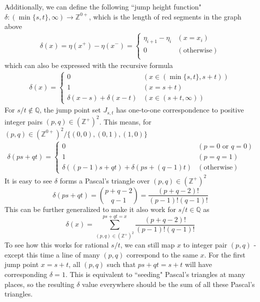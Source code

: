 \documentclass[]{article}
\begin{document}
Additionally, we can define the following ``jump height function" $\delta: (\min\{s,t\},\infty)\to\mathbb{Z}^{0+}$, which is the length of red segments in the graph above
\begin{align*}
\delta(x) = \eta(x^+) - \eta(x^-) =\begin{cases}
\eta_{i+1} - \eta_{i} & (x = x_i)\\
0 & (\text{otherwise})\\
\end{cases}
\end{align*}
which can also be expressed with the recursive formula
\begin{align*}
\delta(x) = \begin{cases}
0 & (x \in (\min\{s, t\}, s + t))\\
1 & (x = s+t)\\
\delta(x-s)+ \delta(x-t) & (x\in(s+t,\infty))
\end{cases}
\end{align*}
For $s/t\notin\mathbb{Q}$, the jump point set $J_{s,t}$ has one-to-one correspondence to positive integer pairs $(p,q)\in(\mathbb{Z}^+)^2$. This means, for $(p,q)\in(\mathbb{Z}^{0+})^2 / \{(0,0), (0,1), (1,0)\}$
\begin{align*}
\delta(ps+qt) = \begin{cases}
 0 & (p= 0 \text{ or } q = 0) \\
 1 & (p = q = 1) \\
 \delta((p-1)s+qt) + \delta(ps+(q-1)t) & (\text{otherwise})
\end{cases}
\end{align*}
It is easy to see $\delta$ forms a Pascal's triangle over $(p,q)\in(\mathbb{Z}^+)^2$
\[
	\delta(ps+qt) = \binom{p+q-2}{q-1} = \frac{(p+q-2)!}{(p-1)!(q-1)!}
\]
This can be further generalized to make it also work for $s/t\in\mathbb{Q}$ as 
\[
	\delta(x) = \sum_{(p,q)\in(\mathbb{Z}^+)^2}^{ps+qt = x} \frac{(p+q-2)!}{(p-1)!(q-1)!}
\]
To see how this works for rational $s/t$, we can still map $x$ to integer pair $(p, q)$ - except this time a line of many $(p, q)$ correspond to the same $x$. For the first jump point $x = s + t$, all $(p, q)$ such that $ps + qt = s + t$ will have corresponding $\delta = 1$. This is equivalent to ``seeding" Pascal's triangles at many places, so the resulting $\delta$ value everywhere should be the sum of all these Pascal's triangles.
\end{document}
